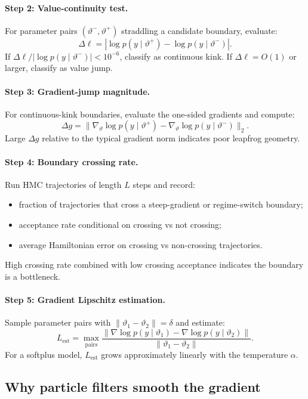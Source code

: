 \documentclass[11pt]{article}
\begin{document}
\paragraph{Step 2: Value-continuity test.}
For parameter pairs $(\vartheta^-, \vartheta^+)$ straddling a candidate
boundary, evaluate:
\[
 \Delta\ell = |\log p(y\mid\vartheta^+) - \log p(y\mid\vartheta^-)|.
\]
If $\Delta\ell / |\log p(y\mid\vartheta^-)| < 10^{-6}$, classify as
continuous kink. If $\Delta\ell = O(1)$ or larger, classify as value jump.

\paragraph{Step 3: Gradient-jump magnitude.}
For continuous-kink boundaries, evaluate the one-sided gradients and compute:
\[
 \Delta g = \|\nabla_\vartheta\log p(y\mid\vartheta^+)
             - \nabla_\vartheta\log p(y\mid\vartheta^-)\|_2.
\]
Large $\Delta g$ relative to the typical gradient norm indicates poor leapfrog
geometry.

\paragraph{Step 4: Boundary crossing rate.}
Run HMC trajectories of length $L$ steps and record:
\begin{itemize}
\item fraction of trajectories that cross a steep-gradient or regime-switch
      boundary;
\item acceptance rate conditional on crossing vs not crossing;
\item average Hamiltonian error on crossing vs non-crossing trajectories.
\end{itemize}
High crossing rate combined with low crossing acceptance indicates the boundary
is a bottleneck.

\paragraph{Step 5: Gradient Lipschitz estimation.}
Sample parameter pairs with $\|\vartheta_1 - \vartheta_2\| = \delta$ and
estimate:
\[
 L_{\text{est}} = \max_{\text{pairs}}
   \frac{\|\nabla\log p(y\mid\vartheta_1) - \nabla\log p(y\mid\vartheta_2)\|}
        {\|\vartheta_1 - \vartheta_2\|}.
\]
For a softplus model, $L_{\text{est}}$ grows approximately linearly with the
temperature $\alpha$.

\subsection{Why particle filters smooth the gradient}\label{sec:pf-smoothing}
\end{document}
